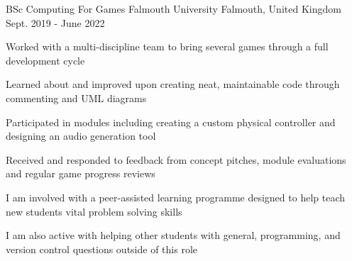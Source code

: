 

\begin{cventries}

  \cventry
    {BSc Computing For Games} %
    {Falmouth University} %
    {Falmouth, United Kingdom} %
    {Sept. 2019 - June 2022} %
    {
      \begin{cvitems} %
        \item Worked with a multi-discipline team to bring several games through a full development cycle
        \item Learned about and improved upon creating neat, maintainable code through commenting and UML diagrams
        \item Participated in modules including creating a custom physical controller and designing an audio generation tool
        \item Received and responded to feedback from concept pitches, module evaluations and regular game progress reviews
        \item I am involved with a peer-assisted learning programme designed to help teach new students vital problem solving skills
        \item I am also active with helping other students with general, programming, and version control questions outside of this role
      \end{cvitems}
    }

\end{cventries}